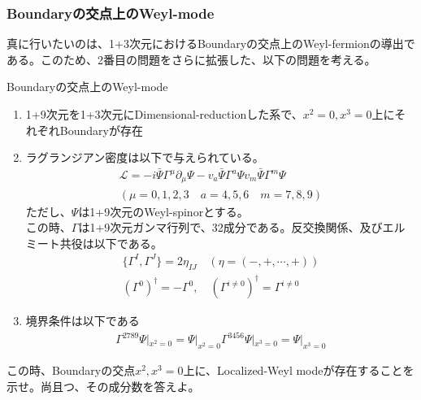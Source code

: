 \documentclass[dvipdfmx,a4paper,10.5pt]{article}
\numberwithin{equation}{section}
\begin{document}
\subsubsection{Boundaryの交点上のWeyl-mode}
真に行いたいのは、1+3次元におけるBoundaryの交点上のWeyl-fermionの導出である。このため、2番目の問題をさらに拡張した、以下の問題を考える。
\begin{problembox}{Boundaryの交点上のWeyl-mode}
    \begin{enumerate}
        \item 1+9次元を1+3次元にDimensional-reductionした系で、$x^{2}=0,x^{3}=0$上にそれぞれBoundaryが存在
        \item ラグランジアン密度は以下で与えられている。
        \begin{gather*}
            \mathcal{L}=-i\bar{\Psi}\Gamma^{\mu}\partial_{\mu}\Psi-v_{a}\bar{\Psi}\Gamma^{a}\Psi v_{m}\bar{\Psi}\Gamma^{m}\Psi\\
            (\mu=0,1,2,3\quad a=4,5,6\quad m=7,8,9)
        \end{gather*}
        ただし、$\Psi$は1+9次元のWeyl-spinorとする。\\
        この時、$\Gamma$は1+9次元ガンマ行列で、32成分である。反交換関係、及びエルミート共役は以下である。
        \begin{gather*}
            \{\Gamma^{I},\Gamma^{J}\}=2\eta_{IJ}\quad (\eta=(-,+,\cdots,+))\\
            (\Gamma^{0})^{\dagger}=-\Gamma^{0},\quad (\Gamma^{i\neq 0})^{\dagger}=\Gamma^{i\neq 0}
        \end{gather*}
        \item 境界条件は以下である
        \begin{align*}
            \Gamma^{2789}\Psi|_{x^{2}=0}=\Psi|_{x^{2}=0}
            \Gamma^{3456}\Psi|_{x^{3}=0}=\Psi|_{x^{3}=0}
        \end{align*}
    \end{enumerate}
    この時、Boundaryの交点$x^{2},x^{3}=0$上に、Localized-Weyl modeが存在することを示せ。尚且つ、その成分数を答えよ。
\end{problembox}
\end{document}
